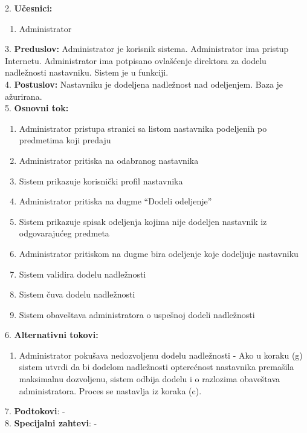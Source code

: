 \documentclass{article}
\begin{document}
2. \textbf{Učesnici:}
\begin{enumerate} [label=(\alph*)]
\item Administrator
\end{enumerate} 

3. \textbf{Preduslov:} Administrator je korisnik sistema. Administrator ima pristup Internetu. Administrator ima potpisano ovlašćenje direktora za dodelu nadležnosti nastavniku. Sistem je u funkciji. \\

4. \textbf{Postuslov:} Nastavniku je dodeljena nadležnost nad odeljenjem. Baza je ažurirana. \\

5. \textbf{Osnovni tok:} 
\begin{enumerate} [label=(\alph*)]
\item Administrator pristupa stranici sa listom nastavnika podeljenih po predmetima koji predaju
\item Administrator pritiska na odabranog nastavnika
\item Sistem prikazuje korisnički profil nastavnika
\item Administrator pritiska na dugme ``Dodeli odeljenje''
\item Sistem prikazuje spisak odeljenja kojima nije dodeljen nastavnik iz odgovarajućeg predmeta
\item Administrator pritiskom na dugme bira odeljenje koje dodeljuje nastavniku
\item Sistem validira dodelu nadležnosti
\item Sistem čuva dodelu nadležnosti
\item Sistem obaveštava administratora o uspešnoj dodeli nadležnosti
\end{enumerate}

6. \textbf{Alternativni tokovi:}
\begin{enumerate} [label=(\roman*)]
    \item Administrator pokušava nedozvoljenu dodelu nadležnosti - Ako u koraku (g) sistem utvrdi da bi dodelom nadležnosti opterećnost nastavnika premašila maksimalnu dozvoljenu, sistem odbija dodelu i o razlozima obaveštava administratora. Proces se nastavlja iz koraka (c).
\end{enumerate}

7. \textbf{Podtokovi}: - \\

8. \textbf{Specijalni zahtevi}: - \\
\end{document}

